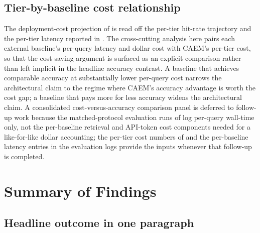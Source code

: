 \subsection{Tier-by-baseline cost relationship}
\label{sec:comp-tier-baseline}

The deployment-cost projection of  is read off the per-tier hit-rate trajectory and the per-tier latency reported in . The cross-cutting analysis here pairs each external baseline's per-query latency and dollar cost with CAEM's per-tier cost, so that the cost-saving argument is surfaced as an explicit comparison rather than left implicit in the headline accuracy contrast. A baseline that achieves comparable accuracy at substantially lower per-query cost narrows the architectural claim to the regime where CAEM's accuracy advantage is worth the cost gap; a baseline that pays more for less accuracy widens the architectural claim. A consolidated cost-versus-accuracy comparison panel is deferred to follow-up work because the matched-protocol evaluation runs of  log per-query wall-time only, not the per-baseline retrieval and API-token cost components needed for a like-for-like dollar accounting; the per-tier cost numbers of  and the per-baseline latency entries in the evaluation logs provide the inputs whenever that follow-up is completed.

\section{Summary of Findings}
\label{sec:summary-findings}

\subsection{Headline outcome in one paragraph}
\label{sec:summary-headline}

